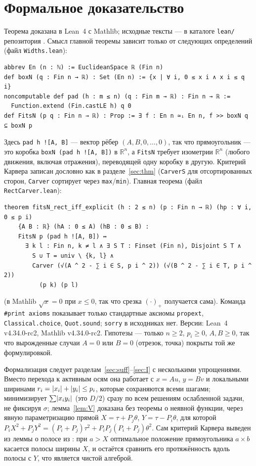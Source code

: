 \documentclass[11pt]{article}
\theoremstyle{definition}
\theoremstyle{remark}
\newcommand{\R}{\mathbb{R}}
\DeclarePairedDelimiter{\abs}{\lvert}{\rvert}
\begin{document}
\section{Формальное доказательство}\label{sec:lean}

Теорема доказана в Lean~4 с Mathlib; исходные тексты --- в каталоге \texttt{lean/} репозитория \cite{Repo}.
Смысл главной теоремы зависит только от следующих определений (файл \texttt{Widths.lean}):
\begin{verbatim}
abbrev En (n : ℕ) := EuclideanSpace ℝ (Fin n)
def boxN (q : Fin n → ℝ) : Set (En n) := {x | ∀ i, 0 ≤ x i ∧ x i ≤ q i}
noncomputable def pad (h : m ≤ n) (q : Fin m → ℝ) : Fin n → ℝ :=
  Function.extend (Fin.castLE h) q 0
def FitsN (p q : Fin n → ℝ) : Prop := ∃ f : En n ≃ᵢ En n, f >> boxN q ⊆ boxN p
\end{verbatim}
Здесь \texttt{pad h ![A, B]} --- вектор рёбер $(A,B,0,\dots,0)$, так что прямоугольник --- это коробка
\texttt{boxN (pad h ![A, B])} в $\R^n$, а \texttt{FitsN} требует изометрии $\R^n$ (любого движения, включая
отражения), переводящей одну коробку в другую. Критерий Карвера записан дословно как в разделе~\ref{sec:thm}
(\texttt{CarverS} для отсортированных сторон, \texttt{Carver} сортирует через \texttt{max}/\texttt{min}).
Главная теорема (файл \texttt{RectCarver.lean}):
\begin{verbatim}
theorem fitsN_rect_iff_explicit (h : 2 ≤ n) (p : Fin n → ℝ) (hp : ∀ i, 0 ≤ p i)
    {A B : ℝ} (hA : 0 ≤ A) (hB : 0 ≤ B) :
    FitsN p (pad h ![A, B]) ↔
      ∃ k l : Fin n, k ≠ l ∧ ∃ S T : Finset (Fin n), Disjoint S T ∧
        S ∪ T = univ \ {k, l} ∧
        Carver (√(A ^ 2 - ∑ i ∈ S, p i ^ 2)) (√(B ^ 2 - ∑ i ∈ T, p i ^ 2))
          (p k) (p l)
\end{verbatim}
(в Mathlib $\sqrt x=0$ при $x\le0$, так что срезка $(\cdot)_+$ получается сама). Команда
\texttt{\#print axioms} показывает только стандартные аксиомы \texttt{propext}, \texttt{Classical.choice},
\texttt{Quot.sound}; \texttt{sorry} в исходниках нет. Версии: Lean~4 v4.34.0-rc2, Mathlib v4.34.0-rc2.
Гипотезы --- только $n\ge2$, $p_i\ge0$, $A,B\ge0$, так что вырожденные случаи $A=0$ или $B=0$ (отрезок,
точка) покрыты той же формулировкой.

Формализация следует разделам~\ref{sec:suff}--\ref{sec:I} с несколькими упрощениями. Вместо перехода к
активным осям она работает с $x=Au$, $y=Bv$ и локальными ширинами $r_i=\abs{x_i}+\abs{y_i}\le p_i$, которые
сохраняются всеми шагами; минимизирует $\sum\abs{x_iy_i}$ (это $D/2$) сразу по всем решениям ослабленной задачи,
не фиксируя $\sigma$; лемма~\ref{lem:V} доказана без теоремы о неявной функции, через явную параметризацию
прямой $X=\tau+P_j\theta$, $Y=\tau-P_i\theta$, для которой $P_iX^2+P_jY^2=(P_i+P_j)\tau^2+P_iP_j(P_i+P_j)\theta^2$.
Сам критерий Карвера выведен из леммы о полосе из \cite{Levit2026}: при $a>X$ оптимальное положение
прямоугольника $a\times b$ касается полосы ширины $X$, и остаётся сравнить его протяжённость вдоль полосы с
$Y$, что является чистой алгеброй.
\end{document}
